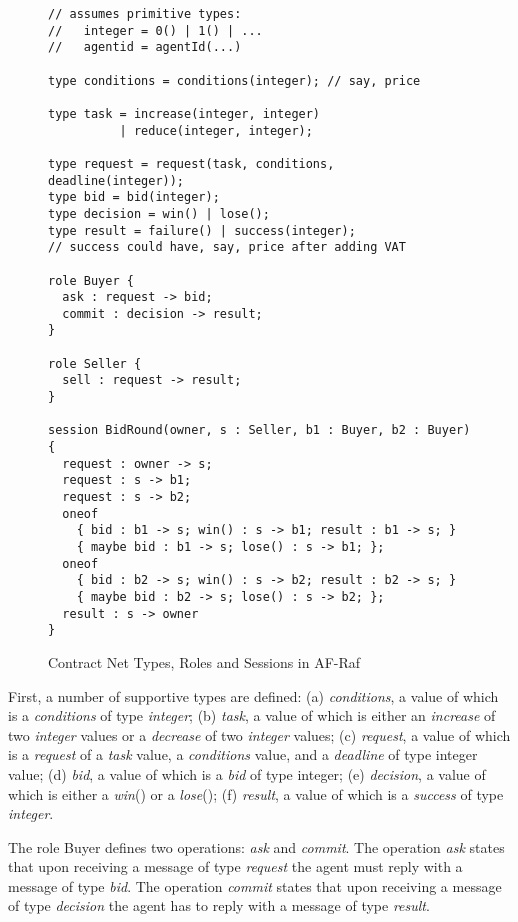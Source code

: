 \documentclass[a4paper,12pt,oneside,fleqn]{book} %
\begin{document}
\begin{figure}\footnotesize %
\begin{verbatim}
// assumes primitive types:
//   integer = 0() | 1() | ...
//   agentid = agentId(...)

type conditions = conditions(integer); // say, price

type task = increase(integer, integer)
          | reduce(integer, integer);

type request = request(task, conditions, deadline(integer));
type bid = bid(integer);
type decision = win() | lose();
type result = failure() | success(integer);
// success could have, say, price after adding VAT

role Buyer {
  ask : request -> bid;
  commit : decision -> result;
}

role Seller {
  sell : request -> result;
}

session BidRound(owner, s : Seller, b1 : Buyer, b2 : Buyer) {
  request : owner -> s;
  request : s -> b1;
  request : s -> b2;
  oneof
    { bid : b1 -> s; win() : s -> b1; result : b1 -> s; }
    { maybe bid : b1 -> s; lose() : s -> b1; };
  oneof
    { bid : b2 -> s; win() : s -> b2; result : b2 -> s; }
    { maybe bid : b2 -> s; lose() : s -> b2; };
  result : s -> owner
}
\end{verbatim}
\caption{Contract Net Types, Roles and Sessions in AF-Raf}
\label{fig:contract-roles}
\end{figure} %

First, a number of supportive types are defined: (a) \textit{conditions}, a
value of which is a \textit{conditions} of type \textit{integer}; (b)
\textit{task}, a value of which is either an \textit{increase} of two
\textit{integer} values or a \textit{decrease} of two \textit{integer}
values; (c) \textit{request}, a value of which is a \textit{request} of a
\textit{task} value, a \textit{conditions} value, and a \textit{deadline}
of type integer value; (d) \textit{bid}, a value of which is a \textit{bid}
of type integer; (e) \textit{decision}, a value of which is either a
\textit{win}() or a \textit{lose}(); (f) \textit{result}, a value of which
is a \textit{success} of type \textit{integer}.

The role Buyer defines two operations: \textit{ask} and \textit{commit}.
The operation \textit{ask} states that upon receiving a message of type
\textit{request} the agent must reply with a message of type \textit{bid}.
The operation \textit{commit} states that upon receiving a message of type
\textit{decision} the agent has to reply with a message of type
\textit{result}.
\end{document}
